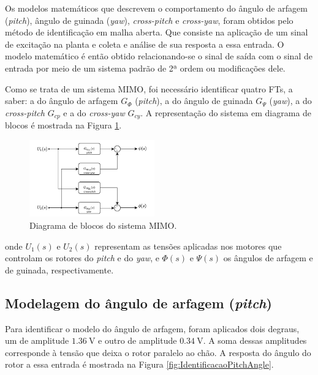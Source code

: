 
Os modelos matemáticos que descrevem o comportamento do ângulo de arfagem (\textit{pitch}), ângulo de guinada (\textit{yaw}), \textit{cross-pitch} e \textit{cross-yaw}, foram obtidos pelo método de identificação em malha aberta. Que consiste na aplicação de um sinal de excitação na planta e coleta e análise de sua resposta a essa entrada. O modelo matemático é então obtido relacionando-se o sinal de saída com o sinal de entrada por meio de um sistema padrão de 2ª ordem ou modificações dele.

Como se trata de um sistema MIMO, foi necessário identificar quatro FTs, a saber: a do ângulo de arfagem $G_{\Phi}$ (\textit{pitch}), a do ângulo de guinada $G_{\Psi}$ (\textit{yaw}), a do \textit{cross-pitch} $G_{cp}$ e a do \textit{cross-yaw} $G_{cy}$. A representação do sistema em diagrama de blocos é mostrada na Figura \ref{fig:IdentificaMIMOSystem}.

\begin{figure}[H]
    \centering
    \includegraphics[width=0.48\textwidth]{figures/Identificacao/Identificacao_MIMO.pdf}
    \caption{Diagrama de blocos do sistema MIMO.}
    \label{fig:IdentificaMIMOSystem}
\end{figure}

\noindent onde $U_{1}(s)$ e $U_{2}(s)$ representam as tensões aplicadas nos motores que controlam os rotores do \textit{pitch} e do \textit{yaw}, e $\Phi(s)$ e $\Psi(s)$ os ângulos de arfagem e de guinada, respectivamente.

\subsection{\textbf{Modelagem do ângulo de arfagem (\textit{pitch})}}

Para identificar o modelo do ângulo de arfagem, foram aplicados dois degraus, um de amplitude $\SI{1.36}{\volt}$ e outro de amplitude $\SI{0.34}{\volt}$. A soma dessas amplitudes corresponde à tensão que deixa o rotor paralelo ao chão. A resposta do ângulo do rotor a essa entrada é mostrada na Figura \ref{fig:IdentificacaoPitchAngle}.

